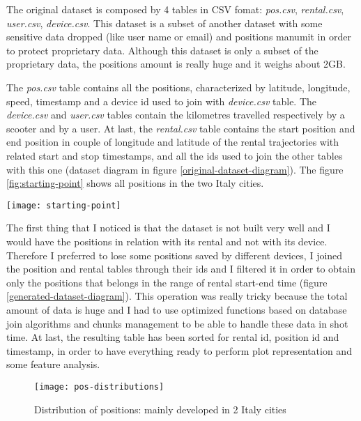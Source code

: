 The original dataset is composed by 4 tables in CSV fomat: \textit{pos.csv}, \textit{rental.csv}, \textit{user.csv}, \textit{device.csv}. This dataset is a subset of another dataset with some sensitive data dropped (like user name or email) and positions manumit in order to protect proprietary data. Although this dataset is only a subset of the proprietary data, the positions amount is really huge and it weighs about 2GB. 

The \textit{pos.csv} table contains all the positions, characterized by latitude, longitude, speed, timestamp and a device id used to join with \textit{device.csv} table. The \textit{device.csv} and \textit{user.csv} tables contain the kilometres travelled respectively by a scooter and by a user. At last, the \textit{rental.csv} table contains the start position and end position in couple of longitude and latitude of the rental trajectories with related start and stop timestamps, and all the ids used to join the other tables with this one (dataset diagram in figure \ref{original-dataset-diagram}). The figure \ref{fig:starting-point} shows all positions in the two Italy cities.

\begin{figure*}[bt]
	\centering
	\texttt{[image: starting-point]}
	\caption{Trajectories without clustering in 2 Italy cities}
	\label{fig:starting-point}
\end{figure*}

The first thing that I noticed is that the dataset is not built very well and I would have the positions in relation with its rental and not with its device. Therefore I preferred to lose some positions saved by different devices, I joined the position and rental tables through their ids and I filtered it in order to obtain only the positions that belongs in the range of rental start-end time (figure \ref{generated-dataset-diagram}). This operation was really tricky because the total amount of data is huge and I had to use optimized functions based on database join algorithms and chunks management to be able to handle these data in shot time. At last, the resulting table has been sorted for rental id, position id and timestamp, in order to have everything ready to perform plot representation and some feature analysis.

\begin{figure}[bt]
	\centering
	\texttt{[image: pos-distributions]}
	\caption{Distribution of positions: mainly developed in 2 Italy cities}
	\label{fig:pos-distributions}
\end{figure}

